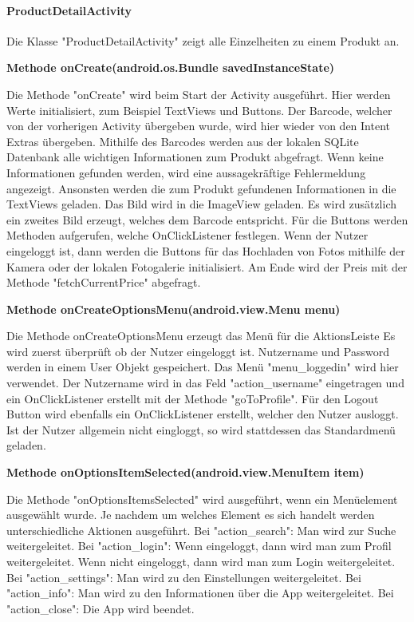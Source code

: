 \documentclass{scrartcl}
\begin{document}
\paragraph{ProductDetailActivity} Die Klasse "ProductDetailActivity" zeigt alle Einzelheiten zu einem Produkt an. \newline

\noindent\textbf{Methode onCreate(android.os.Bundle savedInstanceState)} 

\noindent Die Methode "onCreate" wird beim Start der Activity ausgeführt. Hier werden Werte initialisiert, zum Beispiel TextViews und Buttons. Der Barcode, welcher von der vorherigen Activity übergeben wurde, wird hier wieder von den Intent Extras übergeben. Mithilfe des Barcodes werden aus der lokalen SQLite Datenbank alle wichtigen Informationen zum Produkt abgefragt. Wenn keine Informationen gefunden werden, wird eine aussagekräftige Fehlermeldung angezeigt. Ansonsten werden die zum Produkt gefundenen Informationen in die TextViews geladen. Das Bild wird in die ImageView geladen. Es wird zusätzlich ein zweites Bild erzeugt, welches dem Barcode entspricht. Für die Buttons werden Methoden aufgerufen, welche OnClickListener festlegen. Wenn der Nutzer eingeloggt ist, dann werden die Buttons für das Hochladen von Fotos mithilfe der Kamera oder der lokalen Fotogalerie initialisiert. Am Ende wird der Preis mit der Methode "fetchCurrentPrice" abgefragt. \newline

\noindent\textbf{Methode onCreateOptionsMenu(android.view.Menu menu)} 

\noindent Die Methode onCreateOptionsMenu erzeugt das Menü für die AktionsLeiste Es wird zuerst überprüft ob der Nutzer eingeloggt ist. Nutzername und Password werden in einem User Objekt gespeichert. Das Menü "menu\_loggedin" wird hier verwendet. Der Nutzername wird in das Feld "action\_username" eingetragen und ein OnClickListener erstellt mit der Methode "goToProfile". Für den Logout Button wird ebenfalls ein OnClickListener erstellt, welcher den Nutzer ausloggt. Ist der Nutzer allgemein nicht eingloggt, so wird stattdessen das Standardmenü geladen. \newline

\noindent\textbf{Methode onOptionsItemSelected(android.view.MenuItem item)} 

\noindent Die Methode "onOptionsItemsSelected" wird ausgeführt, wenn ein Menüelement ausgewählt wurde. Je nachdem um welches Element es sich handelt werden unterschiedliche Aktionen ausgeführt. Bei "action\_search": Man wird zur Suche weitergeleitet. Bei "action\_login": Wenn eingeloggt, dann wird man zum Profil weitergeleitet. Wenn nicht eingeloggt, dann wird man zum Login weitergeleitet. Bei "action\_settings": Man wird zu den Einstellungen weitergeleitet. Bei "action\_info": Man wird zu den Informationen über die App weitergeleitet. Bei "action\_close": Die App wird beendet. \newline
\end{document}
